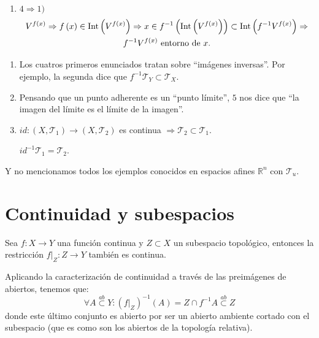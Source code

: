 \begin{demo}
\begin{enumerate}
    \item $4 \Rightarrow 1)$
    \begin{gather*}
        V^{f\left( x \right)} \Rightarrow f\left( x \right) \in \operatorname{Int}\left( V^{f\left( x \right)} \right) \Rightarrow x \in f^{-1}\left( \operatorname{Int}\left( V^{f\left( x \right)} \right) \right) \subset \operatorname{Int}\left( f^{-1}V^{f\left( x \right)} \right) \Rightarrow \\
        f^{-1}V^{f\left( x \right) } \text{ entorno de } x.
    \end{gather*}
\end{enumerate}
\end{demo}

\begin{obs}
\begin{enumerate}
    \item Los cuatros primeros enunciados tratan sobre ``imágenes inversas''. Por ejemplo, la segunda dice que $f^{-1}\mathcal{T}_Y \subset \mathcal{T}_X$.
    \item Pensando que un punto adherente es un ``punto límite'', $5$ nos dice que ``la imagen del límite es el límite de la imagen''.
    \item $id: \left( X, \mathcal{T}_1 \right) \rightarrow \left( X, \mathcal{T}_2 \right)$ es continua $\Rightarrow \mathcal{T}_2 \subset \mathcal{T}_1$. 
    \begin{demo}
        $id^{-1}\mathcal{T}_1 = \mathcal{T}_2$.
    \end{demo}
\end{enumerate}
Y no mencionamos todos los ejemplos conocidos en espacios afines $\mathbb{R}^n$ con $\mathcal{T}_u$.
\end{obs}


\section{Continuidad y subespacios}%
\label{sec:continuidad_y_subespacios}
\begin{prop}
Sea $f: X \rightarrow Y$ una función continua y $Z \subset X$ un subespacio topológico, entonces la restricción $f|_Z : Z \rightarrow Y$ también es continua.
\end{prop}
\begin{demo}
Aplicando la caracterización de continuidad a través de las preimágenes de abiertos, tenemos que:
\[
\forall A \stackrel{ab}{\subset} Y : \left( f|_Z \right)^{-1} \left( A \right) = Z \cap f^{-1} A \stackrel{ab}{\subset} Z
\]
donde este último conjunto es abierto por ser un abierto ambiente cortado con el subespacio (que es como son los abiertos de la topología relativa).
\end{demo}

